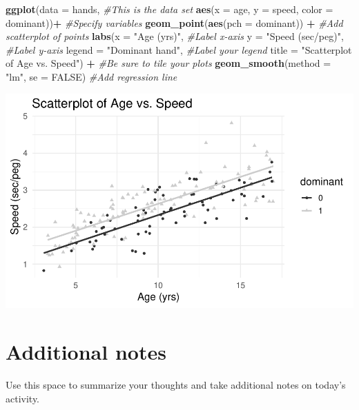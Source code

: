 \documentclass[
]{report}
\newenvironment{Shaded}{\begin{snugshade}}{\end{snugshade}}
\newcommand{\CommentTok}[1]{\textcolor[rgb]{0.56,0.35,0.01}{\textit{#1}}}
\newcommand{\DataTypeTok}[1]{\textcolor[rgb]{0.13,0.29,0.53}{#1}}
\newcommand{\KeywordTok}[1]{\textcolor[rgb]{0.13,0.29,0.53}{\textbf{#1}}}
\newcommand{\NormalTok}[1]{#1}
\newcommand{\OperatorTok}[1]{\textcolor[rgb]{0.81,0.36,0.00}{\textbf{#1}}}
\newcommand{\OtherTok}[1]{\textcolor[rgb]{0.56,0.35,0.01}{#1}}
\newcommand{\StringTok}[1]{\textcolor[rgb]{0.31,0.60,0.02}{#1}}
\begin{document}
\begin{Shaded}
\begin{Highlighting}[]
\KeywordTok{ggplot}\NormalTok{(}\DataTypeTok{data =}\NormalTok{ hands,   }\CommentTok{\#This is the data set}
       \KeywordTok{aes}\NormalTok{(}\DataTypeTok{x =}\NormalTok{ age, }\DataTypeTok{y =}\NormalTok{ speed, }\DataTypeTok{color =}\NormalTok{ dominant))}\OperatorTok{+}\StringTok{  }\CommentTok{\#Specify variables}
\StringTok{  }\KeywordTok{geom\_point}\NormalTok{(}\KeywordTok{aes}\NormalTok{(}\DataTypeTok{pch =}\NormalTok{ dominant)) }\OperatorTok{+}\StringTok{  }\CommentTok{\#Add scatterplot of points}
\StringTok{  }\KeywordTok{labs}\NormalTok{(}\DataTypeTok{x =} \StringTok{"Age (yrs)"}\NormalTok{,  }\CommentTok{\#Label x{-}axis}
       \DataTypeTok{y =} \StringTok{"Speed (sec/peg)"}\NormalTok{,  }\CommentTok{\#Label y{-}axis}
       \DataTypeTok{legend =} \StringTok{"Dominant hand"}\NormalTok{,  }\CommentTok{\#Label your legend}
       \DataTypeTok{title =} \StringTok{"Scatterplot of Age vs. Speed"}\NormalTok{) }\OperatorTok{+}\StringTok{ }\CommentTok{\#Be sure to tile your plots}
\StringTok{  }\KeywordTok{geom\_smooth}\NormalTok{(}\DataTypeTok{method =} \StringTok{"lm"}\NormalTok{, }\DataTypeTok{se =} \OtherTok{FALSE}\NormalTok{)  }\CommentTok{\#Add regression line}
\end{Highlighting}
\end{Shaded}

\begin{center}\includegraphics[width=0.7\linewidth]{10-regression_files/figure-latex/unnamed-chunk-6-1} \end{center}

\hypertarget{additional-notes}{%
\section{Additional notes}\label{additional-notes}}

Use this space to summarize your thoughts and take additional notes on today's activity.
\end{document}
